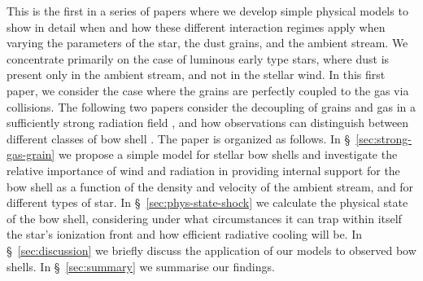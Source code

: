 

This is the first in a series of papers where we develop simple
physical models to show in detail when and how these different
interaction regimes apply when varying the parameters of the star, the
dust grains, and the ambient stream.  We concentrate primarily on the
case of luminous early type stars, where dust is present only in the
ambient stream, and not in the stellar wind.  In this first paper, we
consider the case where the grains are perfectly coupled to the gas
via collisions.  The following two papers consider the decoupling of
grains and gas in a sufficiently strong radiation field
\citep[Paper~II]{Henney:2019b}, and how observations can distinguish
between different classes of bow shell
\citep[Paper~III]{Henney:2019c}.
%
The paper is organized as follows.
%
In \S~\ref{sec:strong-gas-grain} we propose a simple model for stellar
bow shells and investigate the relative importance of wind and radiation in
providing internal support for the bow shell as a function of the
density and velocity of the ambient stream, and for different types of
star.  In \S~\ref{sec:phys-state-shock} we calculate the physical
state of the bow shell, considering under what circumstances it can
trap within itself the star's ionization front and how efficient
radiative cooling will be.
%
In \S~\ref{sec:discussion} we briefly discuss the application
of our models to observed bow shells.
%
In \S~\ref{sec:summary} we summarise our findings. 
%








